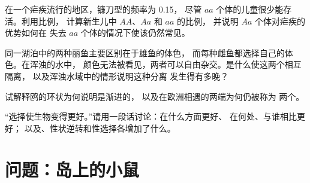 \begin{exercise}[$\star\star\star$]\label{exo:g12:selection-drift-speciation:12}
在一个疟疾流行的地区，镰刀型的频率为 0.15，
尽管 $aa$ 个体的儿童很少能存活。利用比例，
计算新生儿中 $AA$、$Aa$ 和 $aa$ 的比例，
并说明 $Aa$ 个体对疟疾的优势如何在
失去 $aa$ 个体的情况下使该仍然常见。
\end{exercise}

\begin{exercise}[$\star\star\star$]\label{exo:g12:selection-drift-speciation:13}
同一湖泊中的两种丽鱼主要区别在于雄鱼的体色，
而每种雌鱼都选择自己的体色。在浑浊的水中，
颜色无法被看见，两者可以自由杂交。是什么使这两个相互隔离，
以及浑浊水域中的情形说明这种分离
发生得有多晚？
\end{exercise}

\begin{exercise}[$\star\star\star$]\label{exo:g12:selection-drift-speciation:14}
试解释鸥的环状为何说明是渐进的，
以及在欧洲相遇的两端为何仍被称为
两个。
\end{exercise}

\begin{exercise}[$\star\star\star$]\label{exo:g12:selection-drift-speciation:15}
“选择使生物变得更好。”请用一段话讨论：在什么方面更好、
在何处、与谁相比更好；
以及、性状逆转和性选择各增加了什么。
\end{exercise}

\section{问题：岛上的小鼠}

